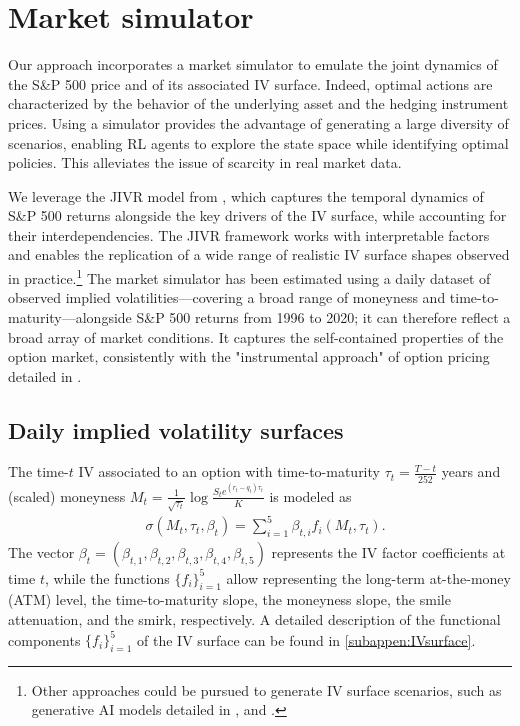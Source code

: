 \documentclass[12pt]{article}
\begin{document}

\section{Market simulator}\label{se:JMD}

Our approach incorporates a market simulator to emulate the joint dynamics of the S\&P 500 price and of its associated IV surface. Indeed, optimal actions are characterized by the behavior of the underlying asset and the hedging instrument prices. Using a simulator provides the advantage of generating a large diversity of scenarios, enabling RL agents to explore the state space while identifying optimal policies. This alleviates the issue of scarcity in real market data.

We leverage the JIVR model from \cite{Frnacois2023}, which captures the temporal dynamics of S\&P 500 returns alongside the key drivers of the IV surface, while accounting for their interdependencies. The JIVR framework works with interpretable factors and enables the replication of a wide range of realistic IV surface shapes observed in practice.\footnote{Other approaches could be pursued to generate IV surface scenarios, such as generative AI models detailed in \cite{chen2023variational}, \cite{choudhary2024funvol} and \cite{vuletic2024volgan}.} The market simulator has been estimated using a daily dataset of observed implied volatilities—covering a broad range of moneyness and time-to-maturity—alongside S\&P 500 returns from 1996 to 2020; it can therefore reflect a broad array of market conditions. It captures the self-contained properties of the option market, consistently with the "instrumental approach" of option pricing detailed in \cite{rebonato2005volatility}.

\subsection{Daily implied volatility surfaces}
\label{sub:IV_model}

The time-$t$ IV associated to an option with time-to-maturity $\tau_t = \frac{T - t}{252}$ years and (scaled) moneyness \mbox{$M_t = \frac{1}{\sqrt{\tau_t}} \log \frac{S_t e^{(r_t - q_t) \tau_t}}{K}$}
is modeled as
\begin{align}
     & \sigma (M_{t},\tau_{t},\beta_{t}) =  \sum_{i=1}^{5}\beta_{t,i}f_{i}(M_{t},\tau_{t}).
     \label{5factormodel_linear}
\end{align}
The vector $\beta_{t} = (\beta_{t,1}, \beta_{t,2}, \beta_{t,3}, \beta_{t,4}, \beta_{t,5})$ represents the IV factor coefficients at time $t$, while the functions $\{f_{i} \}_{i=1}^{5}$ allow representing the long-term at-the-money (ATM) level, the time-to-maturity slope, the moneyness slope, the smile attenuation, and the smirk, respectively. A detailed description of the functional components $\{f_{i} \}_{i=1}^{5}$ of the IV surface can be found in \cref{subappen:IVsurface}.
\end{document}
